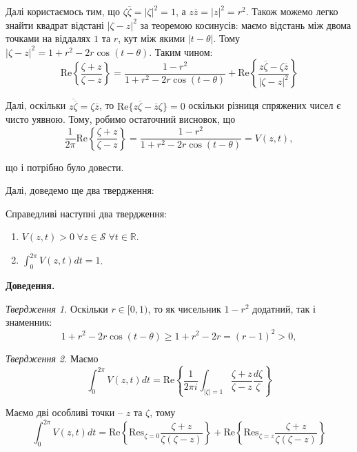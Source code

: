 \documentclass[14pt]{extarticle}
\newcommand{\<}{\langle}
\renewcommand{\>}{\rangle}
\theoremstyle{mystyle}{\newtheorem{definition}{Definition}[section]}
\theoremstyle{mystyle}{\newtheorem{proposition}[definition]{Proposition}}
\theoremstyle{mystyle}{\newtheorem{theorem}[definition]{Theorem}}
\theoremstyle{mystyle}{\newtheorem{lemma}[definition]{Lemma}}
\theoremstyle{mystyle}{\newtheorem{corollary}[definition]{Corollary}}
\theoremstyle{mystyle}{\newtheorem*{remark}{Remark}}
\theoremstyle{mystyle}{\newtheorem*{remarks}{Remarks}}
\theoremstyle{mystyle}{\newtheorem*{example}{Example}}
\theoremstyle{mystyle}{\newtheorem*{examples}{Examples}}
\theoremstyle{definition}{\newtheorem*{exercise}{Exercise}}
\theoremstyle{cstyle}{\newtheorem*{cthm}{}}
\theoremstyle{warn}
\begin{document}
Далі користаємось тим, що $\zeta\overline{\zeta}=|\zeta|^2=1$, а $z\overline{z} = |z|^2=r^2$. Також можемо легко знайти квадрат відстані $|\zeta-z|^2$ за теоремою косинусів: маємо відстань між двома точками на віддалях $1$ та $r$, кут між якими $|t-\theta|$. Тому $|\zeta-z|^2=1+r^2-2r\cos(t-\theta)$. Таким чином:
\begin{equation}
    \text{Re}\left\{\frac{\zeta + z}{\zeta -z}\right\} = \frac{1-r^2}{1+r^2-2r\cos(t-\theta)} + \text{Re}\left\{\frac{z\overline{\zeta} - \zeta\overline{z}}{|\zeta-z|^2} \right\}
\end{equation}

Далі, оскільки $\overline{z\overline{\zeta}}=\zeta\overline{z}$, то $\text{Re}\{z\overline{\zeta}-\overline{z}\zeta\}=0$ оскільки різниця спряжених чисел є чисто уявною. Тому, робимо остаточний висновок, що
\begin{equation}
    \frac{1}{2\pi}\text{Re}\left\{\frac{\zeta + z}{\zeta -z}\right\} = \frac{1-r^2}{1+r^2-2r\cos(t-\theta)} = V(z,t),
\end{equation}

що і потрібно було довести.

Далі, доведемо ще два твердження:
\begin{lemma}\label{lemma:2-2}
    Справедливі наступні два твердження:
    \begin{enumerate}
        \item $V(z,t)>0 \; \forall z \in \mathcal{S} \; \forall t \in \mathbb{R}$.
        \item $\int_0^{2\pi}V(z,t)dt=1$.
    \end{enumerate}
\end{lemma}

\textbf{Доведення.} 

\textit{Твердження 1.} Оскільки $r \in [0,1)$, то як чисельник $1-r^2$ додатний, так і знаменник:
\begin{equation}
    1+r^2-2r\cos(t-\theta) \geq 1+r^2 - 2r = (r-1)^2 > 0,
\end{equation}

\textit{Твердження 2.} Маємо
\begin{equation}
    \int_0^{2\pi}V(z,t)dt = \text{Re}\left\{ \frac{1}{2\pi i}\int_{|\zeta|=1}\frac{\zeta+z}{\zeta-z}\frac{d\zeta}{\zeta}\right\}
\end{equation}

Маємо дві особливі точки -- $z$ та $\zeta$, тому
\begin{equation}
    \int_0^{2\pi}V(z,t)dt = \text{Re}\left\{\text{Res}_{\zeta=0} \frac{\zeta+z}{\zeta(\zeta-z)}\right\} + \text{Re}\left\{\text{Res}_{\zeta=z}\frac{\zeta+z}{\zeta(\zeta-z)}\right\}
\end{equation}
\end{document}
